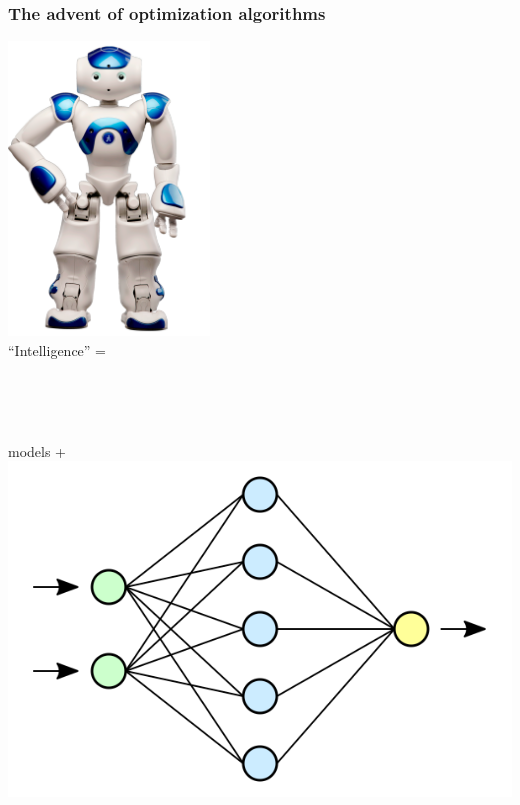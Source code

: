 \documentclass[12pt]{beamer}
\begin{document}
\begin{frame}[allowframebreaks]
\frametitle{The advent of optimization algorithms}
\begin{minipage}[b]{0.25\textwidth}
\centering
\includegraphics[width=0.4\textwidth]{Figures/NAO.png}
\\ ``Intelligence'' =
\end{minipage} 
\hfill
\begin{minipage}[b]{0.2\textwidth}
{\scriptsize \cite{bachoptimization}}
\vskip 2cm
~
\end{minipage} 
\\
\hfill
\begin{minipage}[t]{0.2\textwidth}
\centering
 models + 
\\
\includegraphics[width=\textwidth]{Figures/neural_network.png} 
\end{minipage} 
\begin{minipage}[t]{0.2\textwidth}

\end{minipage}
\end{frame}
\end{document}
